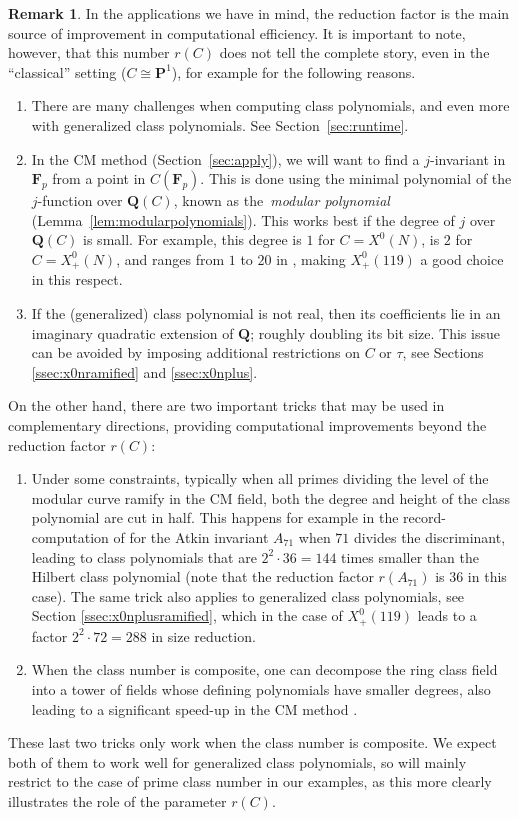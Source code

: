\documentclass{amsart}
\newcommand{\QQ}{\mathbf{Q}}
\newcommand{\PP}{\mathbf{P}}
\newcommand{\FF}{\mathbf{F}}
\newcommand{\xnul}[1]{X^0(#1)}
\newcommand{\xnulN}{\xnul{N}}
\newcommand{\xplus}[1]{X^0_+(#1)}
\newcommand{\xplusN}{\xplus{N}}
\newcommand{\curve}{C}
\numberwithin{equation}{section}
\theoremstyle{definition}
\newtheorem{remark}[equation]{Remark}
\begin{document}
\begin{remark}\label{rmk:besidesrc}
In the applications we have in mind, 
the reduction factor is the main source of improvement in computational efficiency.
It is important to note, however, that this number $r(\curve)$ does not tell the complete story,
even in the ``classical'' setting ($\curve\cong\PP^1$), for example for the following reasons.
\begin{enumerate}
\item There are many challenges when computing class polynomials, and even more with
generalized class polynomials. See Section~\ref{sec:runtime}.
\item In the CM method (Section~\ref{sec:apply}), we will want to find a $j$-invariant in $\FF_p$ from a point in $C(\FF_p)$.
This is done using the minimal polynomial of the $j$-function over $\QQ(C)$,
known as the~\emph{modular polynomial} (Lemma~\ref{lem:modularpolynomials}).
This works best if the degree of $j$ over $\QQ(C)$ is small.
For example, this degree is $1$ for $C = \xnulN$, is $2$ for $C = \xplusN$,
and ranges from $1$ to $20$ in \cite[Table~7.1]{enge-morain2014},
making $\xplus{119}$ a good choice in this respect.
\item If the (generalized) class polynomial is not real, then its coefficients lie in an imaginary quadratic extension of $\QQ$; roughly doubling its bit size.
This issue can be avoided by imposing additional restrictions on $\curve$ or $\tau$,
see Sections \ref{ssec:x0nramified} and \ref{ssec:x0nplus}.
\end{enumerate}
On the other hand, there are two important tricks that may be used in complementary directions,
providing computational improvements beyond the reduction factor $r(\curve)$:
\begin{enumerate}
\item Under some constraints, typically when all primes dividing the level of the modular curve ramify in the CM field, both the degree and height of the class polynomial are cut in half. This happens for example in the
record-computation of \cite{enge-sutherland2010} for the Atkin invariant $A_{71}$ when $71$ divides the discriminant,
leading to class polynomials that are $2^2\cdot 36 = 144$ times smaller than the Hilbert class polynomial (note that the reduction factor $r(A_{71})$ is $36$ in this case).
The same trick also applies to generalized class polynomials, see Section \ref{ssec:x0nplusramified},
which in the case of $\xplus{119}$ leads to a factor $2^2\cdot 72 = 288$ in size reduction.
\item When the class number is composite, one can decompose the ring class field into a tower of fields whose defining polynomials have smaller degrees, also leading to a significant speed-up in the CM method \cite{sutherland2012crt}.
\end{enumerate}
These last two tricks only work when the class number is composite. We expect both of them to work
well for generalized class polynomials,
so will mainly restrict to the case of prime class number in our examples,
as this more clearly illustrates the role of the parameter $r(\curve)$.
\end{remark}
\end{document}
